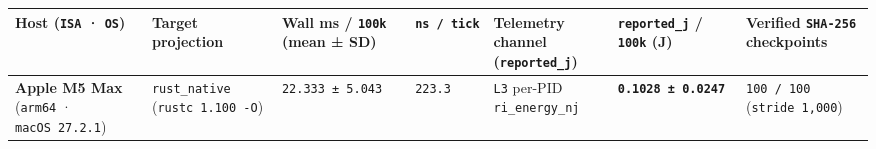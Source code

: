 \documentclass[10pt,letterpaper]{article}
\begin{document}
{\scriptsize\setlength{\tabcolsep}{3.0pt}\renewcommand{\arraystretch}{1.14}
\begin{longtable}[]{@{}
  >{\raggedright\arraybackslash}p{}
  >{\raggedright\arraybackslash}p{}
  >{\raggedleft\arraybackslash}p{}
  >{\raggedleft\arraybackslash}p{}
  >{\raggedright\arraybackslash}p{}
  >{\raggedleft\arraybackslash}p{}
  >{\centering\arraybackslash}p{}@{}}
\toprule\noalign{}
\begin{minipage}[b]{\linewidth}\raggedright
\textbf{Host (\texttt{ISA} · \texttt{OS})}
\end{minipage} & \begin{minipage}[b]{\linewidth}\raggedright
\textbf{Target projection}
\end{minipage} & \begin{minipage}[b]{\linewidth}\raggedleft
\textbf{Wall ms / \texttt{100k} (mean ± SD)}
\end{minipage} & \begin{minipage}[b]{\linewidth}\raggedleft
\textbf{\texttt{ns\ /\allowbreak{}\ tick}}
\end{minipage} & \begin{minipage}[b]{\linewidth}\raggedright
\textbf{Telemetry channel (\texttt{reported\_\allowbreak{}j})}
\end{minipage} & \begin{minipage}[b]{\linewidth}\raggedleft
\textbf{\texttt{reported\_\allowbreak{}j} / \texttt{100k} (J)}
\end{minipage} & \begin{minipage}[b]{\linewidth}\centering
\textbf{Verified \texttt{SHA-256} checkpoints}
\end{minipage} \\
\midrule\noalign{}
\endhead
\bottomrule\noalign{}
\endlastfoot
\textbf{Apple M5 Max} (\texttt{arm64} · \texttt{macOS\ 27.\allowbreak{}2.\allowbreak{}1}) &
\texttt{rust\_\allowbreak{}native} (\texttt{rustc\ 1.\allowbreak{}100\ -\allowbreak{}O}) &
\texttt{22.\allowbreak{}333\ ±\ 5.\allowbreak{}043} & \texttt{223.3} & \texttt{L3} per-PID
\texttt{ri\_\allowbreak{}energy\_\allowbreak{}nj} & \textbf{\texttt{0.\allowbreak{}1028\ ±\ 0.\allowbreak{}0247}} &
\texttt{100\ /\allowbreak{}\ 100} (\texttt{stride\ 1,\allowbreak{}000}) \\

\end{longtable}}
\end{document}
